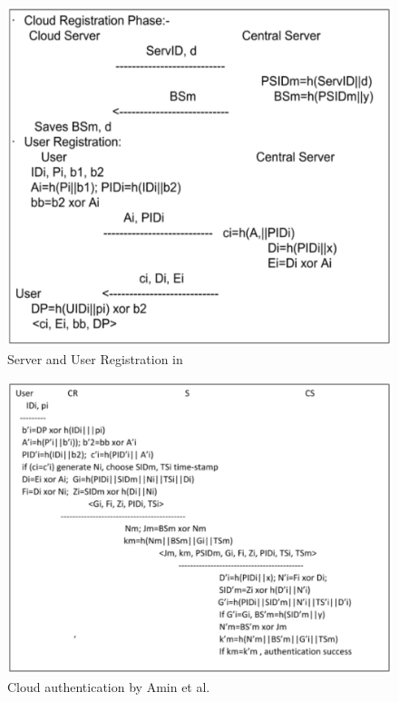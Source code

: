 \begin{figure}[!ht]
\centering
\includegraphics[scale=.75]{src/Figures/chap2/7.eps}
\caption{Server and User Registration in \cite{chap2-key20}}\label{chap2-fig7}
\end{figure}

\newpage

\begin{figure}[!ht]
\centering
\includegraphics[scale=.93]{src/Figures/chap2/8.eps}
\caption{Cloud authentication by Amin et al. \cite{chap2-key20}}\label{chap2-fig8}
\end{figure}

